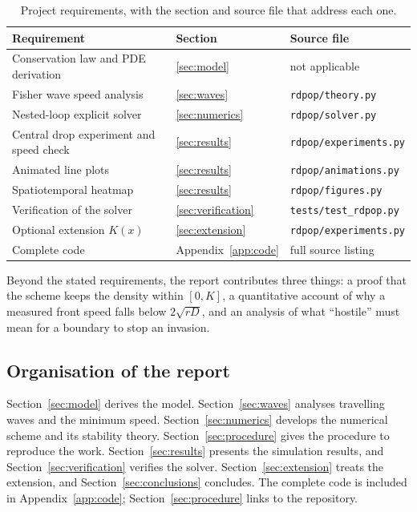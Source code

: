 \documentclass[11pt,a4paper]{article}
\newcommand{\code}[1]{\texttt{\small #1}}
\begin{document}
\begin{table}[H]
\centering\small
\caption{Project requirements, with the section and source file that address each one.}
\label{tab:requirements}
\begin{tabularx}{\textwidth}{Lll}
\toprule
Requirement & Section & Source file\\
\midrule
Conservation law and PDE derivation & \ref{sec:model} & not applicable\\
Fisher wave speed analysis & \ref{sec:waves} & \code{rdpop/theory.py}\\
Nested-loop explicit solver & \ref{sec:numerics} & \code{rdpop/solver.py}\\
Central drop experiment and speed check & \ref{sec:results} & \code{rdpop/experiments.py}\\
Animated line plots & \ref{sec:results} & \code{rdpop/animations.py}\\
Spatiotemporal heatmap & \ref{sec:results} & \code{rdpop/figures.py}\\
Verification of the solver & \ref{sec:verification} & \code{tests/test\_rdpop.py}\\
Optional extension $K(x)$ & \ref{sec:extension} & \code{rdpop/experiments.py}\\
Complete code & Appendix~\ref{app:code} & full source listing\\
\bottomrule
\end{tabularx}
\end{table}

Beyond the stated requirements, the report contributes three things: a proof that the scheme keeps
the density within $[0,K]$, a quantitative account of why a measured front speed falls below
$2\sqrt{rD}$, and an analysis of what ``hostile'' must mean for a boundary to stop an invasion.

\subsection{Organisation of the report}
Section~\ref{sec:model} derives the model. Section~\ref{sec:waves} analyses travelling waves and the
minimum speed. Section~\ref{sec:numerics} develops the numerical scheme and its stability theory.
Section~\ref{sec:procedure} gives the procedure to reproduce the work. Section~\ref{sec:results}
presents the simulation results, and Section~\ref{sec:verification} verifies the solver.
Section~\ref{sec:extension} treats the extension, and Section~\ref{sec:conclusions} concludes. The
complete code is included in Appendix~\ref{app:code}; Section~\ref{sec:procedure} links to the repository.
\end{document}
